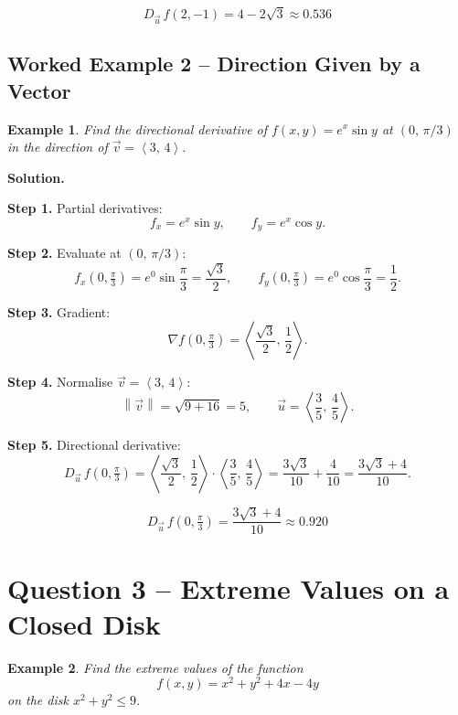\documentclass[12pt]{article}
\newtheorem{example}{Example}
\newcommand{\vect}[1]{\vec{#1}}
\newcommand{\grad}{\nabla}
\newcommand{\norm}[1]{\left\| #1 \right\|}
\newcommand{\inner}[2]{\left\langle #1,\, #2 \right\rangle}
\begin{document}
\[
  \boxed{D_{\vect{u}}\,f(2,-1) = 4 - 2\sqrt{3} \approx 0.536}
\]

\subsection{Worked Example 2 -- Direction Given by a Vector}

\begin{example}
Find the directional derivative of
$f(x,y) = e^x \sin y$
at $(0,\,\pi/3)$ in the direction of $\vect{v}=\inner{3}{4}$.
\end{example}

\textbf{Solution.}

\medskip
\noindent\textbf{Step 1.} Partial derivatives:
\[
  f_x = e^x \sin y, \qquad f_y = e^x \cos y.
\]

\noindent\textbf{Step 2.} Evaluate at $(0,\,\pi/3)$:
\[
  f_x\!\left(0,\tfrac{\pi}{3}\right) = e^0 \sin\frac{\pi}{3}
    = \frac{\sqrt{3}}{2}, \qquad
  f_y\!\left(0,\tfrac{\pi}{3}\right) = e^0 \cos\frac{\pi}{3}
    = \frac{1}{2}.
\]

\noindent\textbf{Step 3.} Gradient:
\[
  \grad f\!\left(0,\tfrac{\pi}{3}\right)
    = \inner{\frac{\sqrt{3}}{2}}{\frac{1}{2}}.
\]

\noindent\textbf{Step 4.} Normalise $\vect{v}=\inner{3}{4}$:
\[
  \norm{\vect{v}} = \sqrt{9+16} = 5, \qquad
  \vect{u} = \inner{\frac{3}{5}}{\frac{4}{5}}.
\]

\noindent\textbf{Step 5.} Directional derivative:
\[
  D_{\vect{u}}\,f\!\left(0,\tfrac{\pi}{3}\right)
    = \inner{\frac{\sqrt{3}}{2}}{\frac{1}{2}}
      \cdot \inner{\frac{3}{5}}{\frac{4}{5}}
    = \frac{3\sqrt{3}}{10} + \frac{4}{10}
    = \frac{3\sqrt{3}+4}{10}.
\]

\[
  \boxed{D_{\vect{u}}\,f\!\left(0,\tfrac{\pi}{3}\right)
    = \frac{3\sqrt{3}+4}{10} \approx 0.920}
\]

\newpage
\section{Question 3 -- Extreme Values on a Closed Disk}

\begin{example}
Find the extreme values of the function
\[
  f(x,y) = x^2 + y^2 + 4x - 4y
\]
on the disk $x^2 + y^2 \le 9$.
\end{example}
\end{document}
